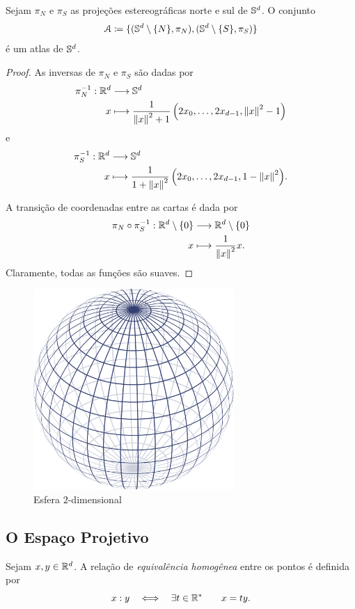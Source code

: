 \begin{prop}
Sejam $\pi_N$ e $\pi_S$ as projeções estereográficas norte e sul de $\S^d$. O conjunto
	\begin{equation*}
	\atlas \coloneqq \{(\S^d \setminus\{N\},\pi_N),(\S^d \setminus\{S\},\pi_S)\}
	\end{equation*}
é um atlas de $\S^d$.
\end{prop}
\begin{proof}
As inversas de $\pi_N$ e $\pi_S$ são dadas por
	\begin{align*}
	\func{\pi_N\inv}{\R^d}{\S^d}{x}{\frac{1}{\nor{x}^2 + 1}\left(2x_0,\ldots,2x_{d-1},\nor{x}^2 - 1\right)}
	\end{align*}
e
	\begin{align*}
	\func{\pi_S\inv}{\R^d}{\S^d}{x}{\frac{1}{1+\nor{x}^2}\left(2x_0,\ldots,2x_{d-1},1-\nor{x}^2\right)}.
	\end{align*}

A transição de coordenadas entre as cartas é dada por
	\begin{align*}
	\func{\pi_N \circ \pi_S\inv}{\R^d \setminus\{0\}}{\R^d \setminus\{0\}}{x}{\frac{1}{\nor{x}^2}x}.
	\end{align*}
Claramente, todas as funções são suaves.
\end{proof}

\begin{figure}[!h]
\centering
\includegraphics[width=3in]{./imagens/esfera}
\caption{Esfera $2$-dimensional}
\end{figure}

\subsection{O Espaço Projetivo}

\begin{defi}
Sejam $x,y \in \R^d$. A relação de \emph{equivalência homogênea} entre os pontos é definida por
	\begin{equation*}
	x : y \sse \exists t \in \R^* \qquad x = ty.
	\end{equation*}
\end{defi}

